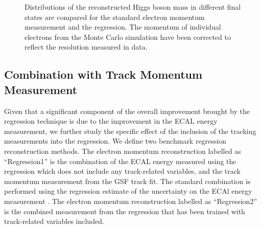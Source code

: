\documentclass{cmspaper}
\begin{document}
\begin{figure}[h]
\centering
	\caption{Distributions of the reconstructed Higgs boson mass in different final states are compared
        for the standard electron momentum measurement and the regression. 
        The momentum of individual electrons from the Monte Carlo simulation have been corrected
        to reflect the resolution measured in data. }
	\label{fig:HZZMass_CompareFinalstates}
\end{figure}



\subsection{ Combination with Track Momentum Measurement }

Given that a significant component of the overall improvement brought by the regression technique is
due to the improvement in the ECAL energy measurement, we further study the specific effect of the
inclusion of the tracking measurements into the regression. We define two benchmark regression
reconstruction methods. The electron momentum reconstruction labelled as ``Regression1'' is the combination
of the ECAL energy measured using the regression which does not include any track-related variables, and
the track momentum measurement from the GSF track fit. The standard combination is performed using the
regression estimate of the uncertainty on the ECAl energy measurement \cite{HZZICHEPCMSNote}. The
electron momentum reconstruction labelled as ``Regression2'' is the combined measurement from 
the regression that has been trained with track-related variables included.
\end{document}

